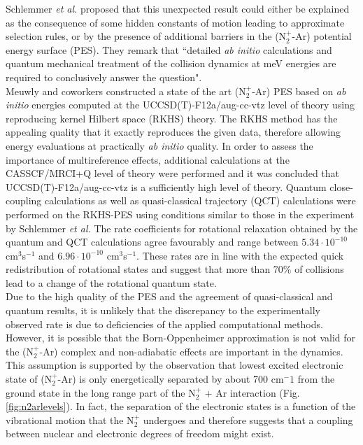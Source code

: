\documentclass[journal=jacsat,manuscript=article]{achemso}
\begin{document}
\noindent
Schlemmer \textit{et al.} proposed that this unexpected result could
either be explained as the consequence of some hidden constants of
motion leading to approximate selection rules, or by the presence of
additional barriers in the (N$_2^+$-Ar) potential energy surface
(PES). They remark that ``detailed \textit{ab initio} calculations and
quantum mechanical treatment of the collision dynamics at meV energies
are required to conclusively answer the
question".\cite{schlemmer.ijms.1999.n2plusargon}\\

\noindent
Meuwly and
coworkers\cite{unke.jcp.2016.n2plusargon,denisalpizar.2017.n2plusargon}
constructed a state of the art (N$_2^+$-Ar) PES based on \textit{ab
  initio} energies computed at the UCCSD(T)-F12a/aug-cc-vtz level of
theory using reproducing kernel Hilbert space (RKHS)
theory.\cite{hollebeek.annrevphychem.1999.rkhs,unke.2017.rkhstoolkit}
The RKHS method has the appealing quality that it exactly reproduces
the given data, therefore allowing energy evaluations at practically
\textit{ab initio} quality.\cite{unke.jcp.2016.n2plusargon} In order
to assess the importance of multireference effects, additional
calculations at the CASSCF/MRCI+Q level of theory were performed and
it was concluded that UCCSD(T)-F12a/aug-cc-vtz is a sufficiently high
level of theory.\cite{denisalpizar.2017.n2plusargon} Quantum
close-coupling calculations\cite{denisalpizar.2017.n2plusargon} as
well as quasi-classical trajectory (QCT)
calculations\cite{unke.jcp.2016.n2plusargon,denisalpizar.2017.n2plusargon}
were performed on the RKHS-PES using conditions similar to those in
the experiment by Schlemmer \textit{et
  al.}\cite{schlemmer.ijms.1999.n2plusargon} The rate coefficients for
rotational relaxation obtained by the quantum and QCT calculations
agree favourably and range between $5.34 \cdot 10^{-10}$
cm$^3$s$^{-1}$ and $6.96 \cdot 10^{-10}$
cm$^3$s$^{-1}$.\cite{denisalpizar.2017.n2plusargon} These rates are in
line with the expected quick redistribution of rotational states and
suggest that more than 70\% of collisions lead to a change of the
rotational quantum state.\\

\noindent
Due to the high quality of the PES and the agreement of
quasi-classical and quantum results, it is unlikely that the
discrepancy to the experimentally observed rate is due to deficiencies
of the applied computational methods. However, it is possible that the
Born-Oppenheimer approximation is not valid for the (N$_2^+$-Ar)
complex and non-adiabatic effects are important in the dynamics. This
assumption is supported by the observation that lowest excited
electronic state of (N$_2^+$-Ar) is only energetically separated by
about 700 cm$^-1$ from the ground state in the long range part of the
N$_2^+$ + Ar interaction (Fig. \ref{fig:n2arlevels}). In fact, the
separation of the electronic states is a function of the vibrational
motion that the N$_2^+$ undergoes and therefore suggests that a
coupling between nuclear and electronic degrees of freedom might
exist.\cite{denisalpizar.2017.n2plusargon}
\end{document}
